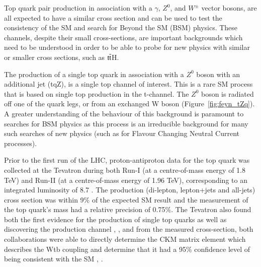 Top quark pair production in association with a $\gamma$, $Z^{0}$, and $W^{\pm}$ vector bosons, are all expected to have a similar cross section and can be used to test the consistency of the SM and search for Beyond the SM (BSM) physics.
These channels, despite their small cross-sections, are important backgrounds which need to be understood in order to be able to probe for new physics with similar or smaller cross sections, such as $\mathrm{t}\overline{\mathrm{t}}$H.

The production of a single top quark in association with a $Z^{0}$ boson with an additional jet (tqZ), is a single top channel of interest.
This is a rare SM process that is based on single top production in the t-channel. The $Z^{0}$ boson is radiated off one of the quark legs, or from an exchanged W boson (Figure~\ref{fig:feyn_tZq}).
A greater understanding of the behaviour of this background is paramount to searches for BSM physics as this process is an irreducible background for many such searches of new physics (such as for Flavour Changing Neutral Current processes). 


Prior to the first run of the LHC, proton-antiproton data for the top quark was collected at the Tevatron during both Run-I (at a centre-of-mass energy of 1.8 TeV) and Run-II (at a centre-of-mass energy of 1.96 TeV), corresponding to an integrated luminosity of 8.7 \fbinv.
The \ttbar production (di-lepton, lepton+jets and all-jets) cross section was within 9\% of the expected SM result  and the measurement of the top quark’s mass had a relative precision of 0.75\%.
The Tevatron also found both the first evidence for the production of single top quarks  as well as discovering the production channel , , and from the measured cross-section, both collaborations were able to directly determine the CKM matrix element which describes the Wtb coupling and determine that it had a 95\% confidence level of being consistent with the SM , .

